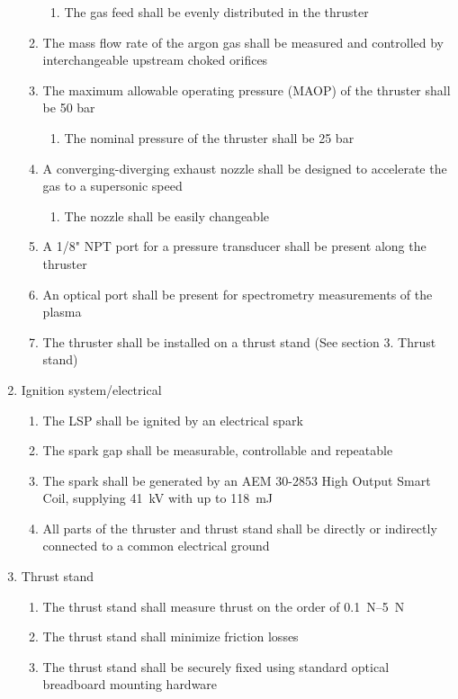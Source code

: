 \begin{enumerate}
\begin{enumerate}
\begin{enumerate}
                        \item The gas feed shall be evenly distributed in the thruster
                    \end{enumerate}
                    \item The mass flow rate of the argon gas shall be measured and controlled by interchangeable upstream choked orifices
                    \item The maximum allowable operating pressure (MAOP) of the thruster shall be 50 bar
                    \begin{enumerate}
                        \item The nominal pressure of the thruster shall be 25 bar
                    \end{enumerate}
                    \item A converging-diverging exhaust nozzle shall be designed to accelerate the gas to a supersonic speed
                    \begin{enumerate}
                        \item The nozzle shall be easily changeable
                    \end{enumerate}
                    \item A 1/8" NPT port for a pressure transducer shall be present along the thruster
                    \item An optical port shall be present for spectrometry measurements of the plasma
                    \item The thruster shall be installed on a thrust stand (See section 3. Thrust stand)
                \end{enumerate}
                \item Ignition system/electrical
                \begin{enumerate}
                    \item The LSP shall be ignited by an electrical spark
                    \item The spark gap shall be measurable, controllable and repeatable
                    \item The spark shall be generated by an AEM 30-2853 High Output Smart Coil, supplying \qty{41}{kV} with up to \qty{118}{mJ}
                    \item All parts of the thruster and thrust stand shall be directly or indirectly connected to a common electrical ground
                \end{enumerate}
                \item Thrust stand
                \begin{enumerate}
                    \item The thrust stand shall measure thrust on the order of \qtyrange{0.1}{5}{N}
                    \item The thrust stand shall minimize friction losses
                    \item The thrust stand shall be securely fixed using standard optical breadboard mounting hardware
                \end{enumerate}
            \end{enumerate}

